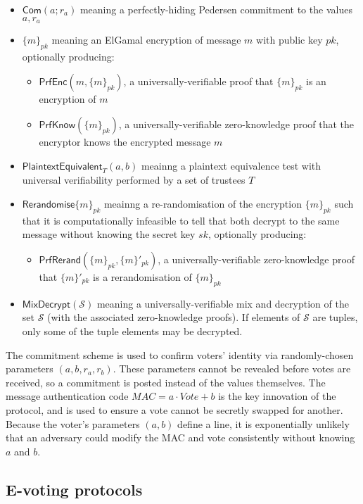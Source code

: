\documentclass[11pt,twoside,a4paper]{article}
\newcommand{\commit}{\mathsf{Com}}
\newcommand{\PrfEnc}{\mathsf{PrfEnc}}
\newcommand{\PrfKnow}{\mathsf{PrfKnow}}
\newcommand{\rerand}{\mathsf{Rerandomise}}
\newcommand{\PrfRerand}{\mathsf{PrfRerand}}
\newcommand{\MixDec}{\mathsf{MixDecrypt}}
\newcommand{\pet}{\mathsf{PlaintextEquivalent}}
\theoremstyle{definition}
\begin{document}
\begin{itemize}
	\item $\commit(a;r_a)$ meaning a perfectly-hiding Pedersen commitment to the values $a, r_a$
	\item $\{m\}_{pk}$ meaning an ElGamal encryption of message $m$ with public key $pk$, optionally producing:
	\begin{itemize}
		\item $\PrfEnc(m, \{m\}_{pk})$, a universally-verifiable proof that $\{m\}_{pk}$ is an encryption of $m$
		\item $\PrfKnow(\{m\}_{pk})$, a universally-verifiable zero-knowledge proof that the encryptor knows the encrypted message $m$
	\end{itemize}
	\item $\pet_T(a, b)$ meainng a plaintext equivalence test with universal verifiability performed by a set of trustees $T$
	\item $\rerand\{m\}_{pk}$ meainng a re-randomisation of the encryption $\{m\}_{pk}$ such that it is computationally infeasible to tell that both decrypt to the same message without knowing the secret key $sk$, optionally producing:
	\begin{itemize}
		\item $\PrfRerand(\{m\}_{pk}, \{m\}'_{pk})$, a universally-verifiable zero-knowledge proof that $\{m\}'_{pk}$ is a rerandomisation of $\{m\}_{pk}$
	\end{itemize}
	\item $\MixDec(\mathcal{S})$ meaning a universally-verifiable mix and decryption of the set $\mathcal{S}$ (with the associated zero-knowledge proofs). If elements of $\mathcal{S}$ are tuples, only some of the tuple elements may be decrypted.
\end{itemize}

The commitment scheme is used to confirm voters' identity via randomly-chosen parameters \((a, b, r_a, r_b)\). These parameters cannot be revealed before votes are received, so a commitment is posted instead of the values themselves. The message authentication code \(MAC = a\cdot Vote+b\) is the key innovation of the protocol, and is used to ensure a vote cannot be secretly swapped for another. Because the voter's parameters \((a, b)\) define a line, it is exponentially unlikely that an adversary could modify the MAC and vote consistently without knowing \(a\) and \(b\).
\subsection{E-voting protocols}
\end{document}
